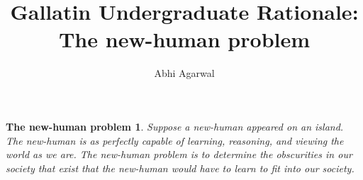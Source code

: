 \documentclass[12pt]{article}
\title{Gallatin Undergraduate Rationale: The new-human problem}
\author{Abhi Agarwal}
\date{}
\newtheorem*{nhp-definition}{The new-human problem}
\begin{document}
\maketitle

\begin{nhp-definition}
Suppose a new-human appeared on an island. The new-human is as perfectly capable of learning, reasoning, and viewing the world as we are. The new-human problem is to determine the obscurities in our society that exist that the new-human would have to learn to fit into our society.
\end{nhp-definition}







\end{document}
